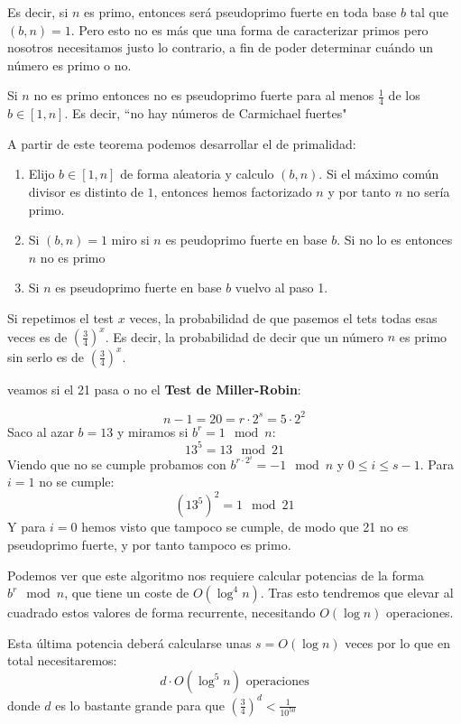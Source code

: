 Es decir, si $n$ es primo, entonces será pseudoprimo fuerte en toda base $b$ tal que $(b,n)=1$.
Pero esto no es más que una forma de caracterizar primos pero nosotros necesitamos justo lo contrario, a fin de poder determinar cuándo un número es primo o no.

\begin{theorem}
Si $n$ no es primo entonces no es pseudoprimo fuerte para al menos $\frac{1}{4}$ de los $b\in [1,n]$. Es decir, ``no hay números de Carmichael fuertes"
\end{theorem}

A partir de este teorema podemos desarrollar el  de primalidad:
\begin{enumerate}
\item Elijo $b\in[1,n]$ de forma aleatoria y calculo $(b,n)$. Si el máximo común divisor es distinto de $1$, entonces hemos factorizado $n$ y por tanto $n$ no sería primo.
\item Si $(b,n)=1$ miro si $n$ es peudoprimo fuerte en base $b$. Si no lo es entonces $n$ no es primo
\item Si $n$ es pseudoprimo fuerte en base $b$ vuelvo al paso 1.
\end{enumerate}

Si repetimos el test $x$ veces, la probabilidad de que pasemos el tets todas esas veces es de $\left(\frac{3}{4}\right)^x$. Es decir, la probabilidad de decir que un número $n$ es primo sin serlo es de $\left(\frac{3}{4}\right)^x$.

\begin{example}
	veamos si el 21 pasa o no el \textbf{Test de Miller-Robin}:

	\[n - 1 = 20 = r · 2^s = 5 · 2^2\]
	Saco al azar $b=13$ y miramos si $b^r = 1 \mod n$:
	\[13^5 = 13 \mod 21\]
	Viendo que no se cumple probamos con $b^{r·2^i}=-1 \mod n$ y $0≤i≤s-1$. Para $i=1$ no se cumple:
	\[(13^5)^2 = 1 \mod 21\]
	Y para $i=0$ hemos visto que tampoco se cumple, de modo que 21 no es pseudoprimo fuerte, y por tanto tampoco es primo.\\[3em]
\end{example}


Podemos ver que este algoritmo nos requiere calcular potencias de la forma $b^r \mod n$, que tiene un coste de $O(\log^4n)$. Tras esto tendremos que elevar al cuadrado estos valores de forma recurrente, necesitando $O(\log n)$ operaciones.

Esta última potencia deberá calcularse unas $s=O(\log n)$ veces por lo que en total necesitaremos:
\[d\cdot O(\log^5 n)\text{ operaciones}\]
donde $d$ es lo bastante grande para que $\left(\frac{3}{4}\right)^d < \frac{1}{10^{50}}$

